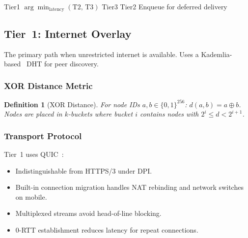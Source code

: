 \documentclass[11pt,a4paper]{article}
\newtheorem{definition}{Definition}[section]
\begin{document}
\begin{algorithm}[H]
\caption{Adaptive Tier Selection}
\label{alg:tier-select}
\begin{algorithmic}[1]
        \State \Return Tier1
    \EndIf
            \State \Return $\arg\min_{\mathrm{latency}}(\text{T2, T3})$
        \EndIf
        \State \Return Tier3
    \EndIf
        \State \Return Tier2
    \EndIf
    \State Enqueue for deferred delivery
\EndFunction
\end{algorithmic}
\end{algorithm}

\subsection{Tier~1: Internet Overlay}

The primary path when unrestricted internet is available.  Uses a
Kademlia-based~\cite{maymounkov2002kademlia} DHT for peer discovery.

\subsubsection{XOR Distance Metric}

\begin{definition}[XOR Distance]
    For node IDs $a, b \in \{0,1\}^{256}$:
    $d(a,b) = a \oplus b$.
    Nodes are placed in $k$-buckets where bucket $i$ contains nodes with
    $2^i \leq d < 2^{i+1}$.
\end{definition}

\subsubsection{Transport Protocol}

Tier~1 uses QUIC~\cite{iyengar2021quic}:

\begin{itemize}
    \item Indistinguishable from HTTPS/3 under DPI.
    \item Built-in connection migration handles NAT rebinding and network
    switches on mobile.
    \item Multiplexed streams avoid head-of-line blocking.
    \item 0-RTT establishment reduces latency for repeat connections.
\end{itemize}
\end{document}
